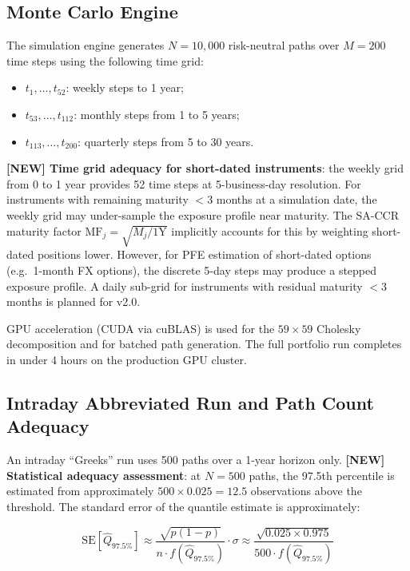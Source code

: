 \documentclass[11pt,a4paper]{article}
\begin{document}
\subsection{Monte Carlo Engine}
\label{sec:mc}

The simulation engine generates $N = 10{,}000$ risk-neutral paths over
$M = 200$ time steps using the following time grid:

\begin{itemize}[noitemsep]
  \item $t_1, \ldots, t_{52}$: weekly steps to 1 year;
  \item $t_{53}, \ldots, t_{112}$: monthly steps from 1 to 5 years;
  \item $t_{113}, \ldots, t_{200}$: quarterly steps from 5 to 30 years.
\end{itemize}

\textbf{[NEW] Time grid adequacy for short-dated instruments}: the weekly
grid from 0 to 1 year provides 52 time steps at 5-business-day resolution.
For instruments with remaining maturity $<3$ months at a simulation date,
the weekly grid may under-sample the exposure profile near maturity. The
SA-CCR maturity factor $\text{MF}_j = \sqrt{M_j / 1\text{Y}}$ implicitly
accounts for this by weighting short-dated positions lower. However, for
PFE estimation of short-dated options (e.g.\ 1-month FX options), the
discrete 5-day steps may produce a stepped exposure profile. A daily
sub-grid for instruments with residual maturity $< 3$ months is planned
for v2.0.

GPU acceleration (CUDA via cuBLAS) is used for the $59 \times 59$ Cholesky
decomposition and for batched path generation. The full portfolio run
completes in under 4 hours on the production GPU cluster.

\subsection{Intraday Abbreviated Run and Path Count Adequacy}
\label{sec:intraday}

An intraday ``Greeks'' run uses 500 paths over a 1-year horizon only.
\textbf{[NEW] Statistical adequacy assessment}: at $N = 500$ paths, the
97.5th percentile is estimated from approximately $500 \times 0.025 = 12.5$
observations above the threshold. The standard error of the quantile
estimate is approximately:

\begin{equation}
  \text{SE}\!\left[\hat{Q}_{97.5\%}\right]
    \approx \frac{\sqrt{p(1-p)}}{n \cdot f(\hat{Q}_{97.5\%})} \cdot \sigma
    \approx \frac{\sqrt{0.025 \times 0.975}}{500 \cdot f(\hat{Q}_{97.5\%})}
  \label{eq:se_pfe}
\end{equation}
\end{document}
